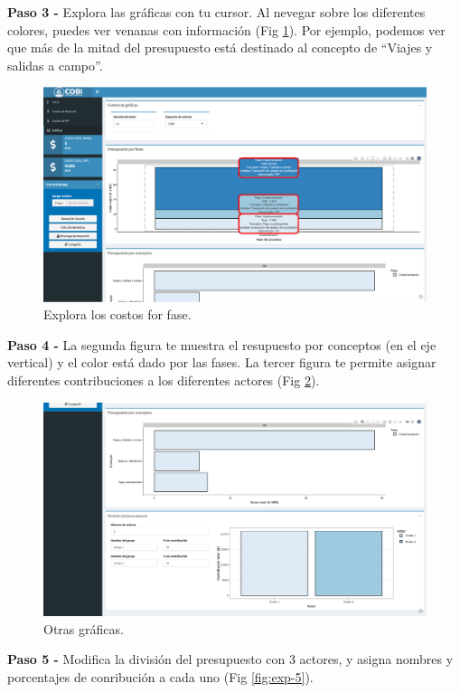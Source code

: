 \documentclass[
]{book}
\begin{document}
\textbf{Paso 3 - } Explora las gráficas con tu cursor. Al nevegar sobre los diferentes colores, puedes ver venanas con información (Fig \ref{fig:exp-3}). Por ejemplo, podemos ver que más de la mitad del presupuesto está destinado al concepto de ``Viajes y salidas a campo''.

\begin{figure}
\includegraphics[width=61.11in]{images/exp-3} \caption{Explora los costos for fase.}\label{fig:exp-3}
\end{figure}

\textbf{Paso 4 - } La segunda figura te muestra el resupuesto por conceptos (en el eje vertical) y el color está dado por las fases. La tercer figura te permite asignar diferentes contribuciones a los diferentes actores (Fig \ref{fig:exp-4}).

\begin{figure}
\includegraphics[width=26.67in]{images/exp-4} \caption{Otras gráficas.}\label{fig:exp-4}
\end{figure}

\textbf{Paso 5 - } Modifica la división del presupuesto con 3 actores, y asigna nombres y porcentajes de conribución a cada uno (Fig \ref{fig:exp-5}).
\end{document}
